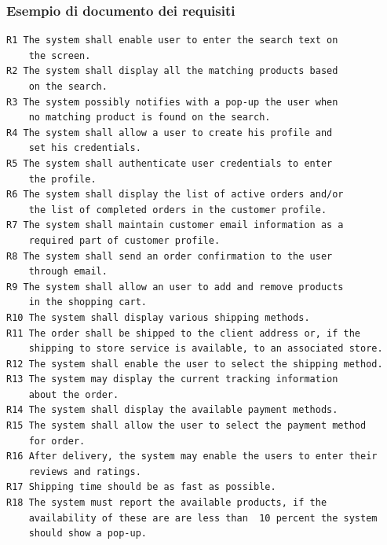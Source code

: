 \documentclass[12pt]{report}
\begin{document}
\subsubsection{Esempio di documento dei requisiti}
\begin{lstlisting}
R1 The system shall enable user to enter the search text on
    the screen.
R2 The system shall display all the matching products based
    on the search.
R3 The system possibly notifies with a pop-up the user when
    no matching product is found on the search.
R4 The system shall allow a user to create his profile and
    set his credentials.
R5 The system shall authenticate user credentials to enter
    the profile.
R6 The system shall display the list of active orders and/or
    the list of completed orders in the customer profile.
R7 The system shall maintain customer email information as a
    required part of customer profile.
R8 The system shall send an order confirmation to the user
    through email.
R9 The system shall allow an user to add and remove products
    in the shopping cart.
R10 The system shall display various shipping methods.
R11 The order shall be shipped to the client address or, if the
    shipping to store service is available, to an associated store.
R12 The system shall enable the user to select the shipping method.
R13 The system may display the current tracking information
    about the order.
R14 The system shall display the available payment methods.
R15 The system shall allow the user to select the payment method
    for order.
R16 After delivery, the system may enable the users to enter their
    reviews and ratings.
R17 Shipping time should be as fast as possible.
R18 The system must report the available products, if the
    availability of these are are less than  10 percent the system
    should show a pop-up.
\end{lstlisting}


\newpage
\end{document}
